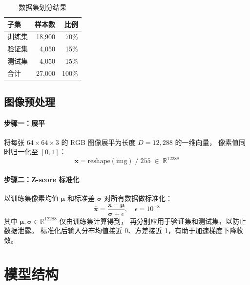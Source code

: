 \documentclass[12pt, a4paper]{article}
\begin{document}
\begin{table}[H]
  \centering
  \caption{数据集划分结果}
  \label{tab:split}
  \begin{tabular}{lrr}
    \toprule
    \textbf{子集} & \textbf{样本数} & \textbf{比例} \\
    \midrule
    训练集 & 18{,}900 & 70\% \\
    验证集 &  4{,}050 & 15\% \\
    测试集 &  4{,}050 & 15\% \\
    \midrule
    合计   & 27{,}000 & 100\% \\
    \bottomrule
  \end{tabular}
\end{table}

\subsection{图像预处理}

\paragraph{步骤一：展平}
将每张 $64\times64\times3$ 的 RGB 图像展平为长度 $D=12{,}288$ 的一维向量，
像素值同时归一化至 $[0, 1]$：
\begin{equation}
  \mathbf{x} = \mathrm{reshape}(\mathrm{img}) \;/\; 255 \;\in\; \mathbb{R}^{12288}
\end{equation}

\paragraph{步骤二：Z-score 标准化}
以训练集像素均值 $\boldsymbol{\mu}$ 和标准差 $\boldsymbol{\sigma}$ 对所有数据做标准化：
\begin{equation}
  \hat{\mathbf{x}} = \frac{\mathbf{x} - \boldsymbol{\mu}}{\boldsymbol{\sigma} + \epsilon}, \quad \epsilon = 10^{-8}
\end{equation}
其中 $\boldsymbol{\mu}, \boldsymbol{\sigma} \in \mathbb{R}^{12288}$ 仅由训练集计算得到，
再分别应用于验证集和测试集，以防止数据泄露。
标准化后输入分布均值接近 0、方差接近 1，有助于加速梯度下降收敛。

\section{模型结构}
\end{document}

